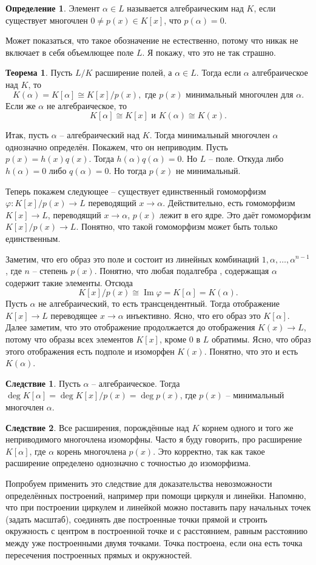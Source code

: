 \documentclass[10pt,a4paper,oneside]{book}
\theoremstyle{definition}
\newtheorem*{defn}{{\color{yellow!30!red} Определение}}
\newtheorem{thm}{{\color{red!40!black} Теорема}}
\newtheorem{cor}{Следствие}
\newcommand{\im}{\operatorname{Im}}
\def\ffi{\varphi}
\def\thrm{\begin{thm}}
\def\ethrm{\end{thm}}
\def\dfn{\begin{defn}}
\def\edfn{\end{defn}}
\def\crl{\begin{cor}}
\def\ecrl{\end{cor}}
\begin{document}
\dfn Элемент $\alpha \in L$ называется алгебраическим над $K$, если существует многочлен $0\neq p(x)\in K[x]$, что $p(\alpha)=0$. 
\edfn

Может показаться, что такое обозначение не естественно, потому что никак не включает в себя объемлющее поле $L$. Я покажу, что это не так страшно.


\thrm Пусть $L/K$ расширение полей, а $\alpha \in L$. Тогда если $\alpha$ алгебраическое над $K$, то $$K(\alpha)=K[\alpha]\cong K[x]/p(x),  \text{ где $p(x)$ минимальный многочлен для $\alpha$}.$$
Если же $\alpha$ не алгебраическое, то $$K[\alpha]\cong K[x] \text{ и } K(\alpha) \cong K(x).$$
\ethrm
\proof Итак, пусть $\alpha$ -- алгебраический над $ K$. Тогда минимальный многочлен $\alpha$ однозначно определён. Покажем, что он неприводим. Пусть $p(x)=h(x)q(x)$. Тогда $h(\alpha)q(\alpha)=0$. Но $L$ -- поле. Откуда либо $h(\alpha)=0$ либо $q(\alpha)=0$. Но тогда $p(x)$ не минимальный.

Теперь покажем следующее -- существует единственный гомоморфизм $\ffi \colon K[x]/p(x) \to L$ переводящий $x \to \alpha$. Действительно, есть гомоморфизм $K[x]\to L$, переводящий $x\to \alpha$, $p(x)$ лежит в его ядре. Это даёт гомоморфизм $K[x]/p(x) \to L$. 
Понятно, что такой гомоморфизм может быть только единственным.

Заметим, что его образ это поле и состоит из линейных комбинаций $1,\alpha,\dots,\alpha^{n-1}$, где $n$ -- степень $p(x)$. Понятно, что любая подалгебра , содержащая $\alpha$ содержит такие элементы. Отсюда $$K[x]/p(x) \cong \im \ffi = K[\alpha]=K(\alpha).$$
Пусть $\alpha$ не алгебраический, то есть трансцендентный. Тогда отображение $K[x] \to L$ переводящее $x\to\alpha$ инъективно. Ясно, что его образ это $K[\alpha]$. Далее заметим, что это отображение продолжается до отображения $K(x) \to L$, потому что образы всех элементов $K[x]$, кроме 0 в $L$ обратимы. Ясно, что образ этого отображения есть подполе и изоморфен $K(x)$. Понятно, что это и есть $K(\alpha)$.   
\endproof

\crl Пусть $\alpha$ -- алгебраическое. Тогда $\deg K[\alpha]= \deg K[x]/p(x)= \deg p(x)$, где $p(x)$ -- минимальный многочлен $\alpha$.
\ecrl

\crl Все расширения, порождённые над $K$ корнем одного и того же неприводимого многочлена изоморфны. Часто я буду говорить, про расширение $K[\alpha]$, где $\alpha$ корень многочлена $p(x)$. Это корректно, так как такое расширение определено однозначно с точностью до изоморфизма.
\ecrl

Попробуем применить это следствие для доказательства невозможности определённых  построений, например при помощи циркуля и линейки. Напомню, что при построении циркулем и линейкой можно поставить пару начальных точек (задать масштаб), соединять две построенные  точки прямой и строить окружность с центром в построенной точке и с расстоянием, равным расстоянию между уже построенными двумя точками. Точка построена, если она есть точка пересечения построенных прямых и окружностей. 
\end{document}
